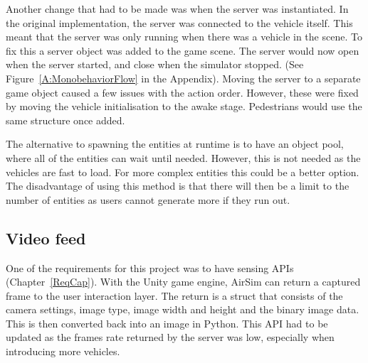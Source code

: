 Another change that had to be made was when the server was instantiated. In the original implementation, the server was connected to the vehicle itself. This meant that the server was only running when there was a vehicle in the scene. To fix this a server object was added to the game scene. The server would now open when the server started, and close when the simulator stopped. (See Figure~\ref{A:MonobehaviorFlow} in the Appendix). Moving the server to a separate game object caused a few issues with the action order. However, these were fixed by moving the vehicle initialisation to the awake stage. Pedestrians would use the same structure once added. 

The alternative to spawning the entities at runtime is to have an object pool, where all of the entities can wait until needed. However, this is not needed as the vehicles are fast to load. For more complex entities this could be a better option. The disadvantage of using this method is that there will then be a limit to the number of entities as users cannot generate more if they run out. 


\subsection{Video feed} \label{06:VideoFeed}
One of the requirements for this project was to have sensing APIs (Chapter~\ref{ReqCap}). With the Unity game engine, AirSim can return a captured frame to the user interaction layer. The return is a struct that consists of the camera settings, image type, image width and height and the binary image data. This is then converted back into an image in Python. This API had to be updated as the frames rate returned by the server was low, especially when introducing more vehicles. 

